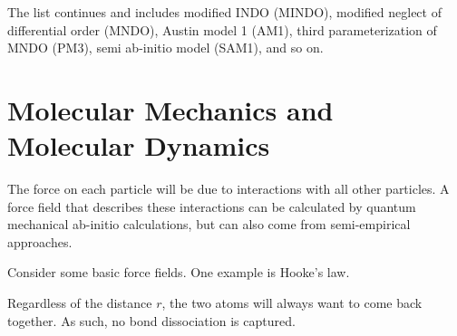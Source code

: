 \documentclass[12pt,a4paper,titlepage]{article}
\begin{document}
The list continues and includes modified INDO (MINDO), modified neglect of differential order (MNDO), Austin model 1 (AM1), third parameterization of MNDO (PM3), semi ab-initio model (SAM1), and so on.

\newpage
\section{Molecular Mechanics and Molecular Dynamics}
The force on each particle will be due to interactions with all other particles. A force field that describes these interactions can be calculated by quantum mechanical ab-initio calculations, but can also come from semi-empirical approaches.
\begin{center}
\end{center}
Consider some basic force fields. One example is Hooke's law.
\begin{center}
\end{center}
Regardless of the distance $r$, the two atoms will always want to come back together. As such, no bond dissociation is captured.\\
\end{document}
